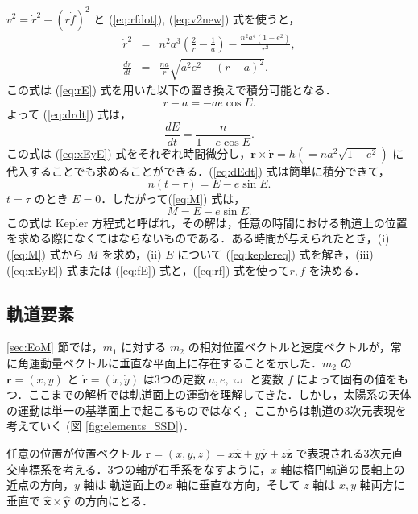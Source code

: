 \documentclass[11pt,a4paper,oneside,onecolumn]{jarticle}
\begin{document}
$v^2 = \dot{r}^2 + (r \dot{f})^2$ と (\ref{eq:rfdot}), (\ref{eq:v2new}) 式を使うと，
\begin{eqnarray}
\dot{r}^2 & = & n^2 a^3 \left( \frac{2}{r} - \frac{1}{a} \right) - \frac{n^2 a^4 (1 - e^2)}{r^2}, \\
\frac{dr}{dt} & = & \frac{na}{r} \sqrt{a^2 e^2 - (r - a)^2}. \label{eq:drdt}
\end{eqnarray}
この式は (\ref{eq:rE}) 式を用いた以下の置き換えで積分可能となる．
\begin{equation}
r - a = - a e \cos E.
\end{equation}
よって (\ref{eq:drdt}) 式は，
\begin{equation}
\frac{dE}{dt} = \frac{n}{1 - e \cos E}. \label{eq:dEdt}
\end{equation}
この式は (\ref{eq:xEyE}) 式をそれぞれ時間微分し，${\bm r} \times \dot{{\bm r}} = h ( = n a^2 \sqrt{1 - e^2} )$ に代入することでも求めることができる．(\ref{eq:dEdt}) 式は簡単に積分できて，
\begin{equation}
n (t - \tau) = E - e \sin E. \label{eq:tauE}
\end{equation}
$t = \tau$ のとき $E = 0$．したがって(\ref{eq:M}) 式は，
\begin{equation}
M = E - e \sin E. \label{eq:keplereq}
\end{equation}
この式は Kepler 方程式と呼ばれ，その解は，任意の時間における軌道上の位置を求める際になくてはならないものである．ある時間が与えられたとき，(i) (\ref{eq:M}) 式から $M$ を求め，(ii) $E$ について (\ref{eq:keplereq}) 式を解き，(iii) (\ref{eq:xEyE}) 式または (\ref{eq:fE}) 式と，(\ref{eq:rf}) 式を使って$r, f$ を決める．

\subsection{軌道要素 \label{sec:elements}}
 \ref{sec:EoM} 節では，$m_1$ に対する $m_2$ の相対位置ベクトルと速度ベクトルが，常に角運動量ベクトルに垂直な平面上に存在することを示した．$m_2$ の ${\bm r} = (x, y)$ と $\dot{\bm r} = (\dot{x}, \dot{y})$ は3つの定数 $a, e, \varpi$ と変数 $f$ によって固有の値をもつ．ここまでの解析では軌道面上の運動を理解してきた．しかし，太陽系の天体の運動は単一の基準面上で起こるものではなく，ここからは軌道の3次元表現を考えていく (図 \ref{fig:elements_SSD})．
 
任意の位置が位置ベクトル ${\bm r} = (x, y, z) = x \hat{\bm x} + y \hat{\bm y} + z \hat{\bm z}$ で表現される3次元直交座標系を考える．3つの軸が右手系をなすように，$x$ 軸は楕円軌道の長軸上の近点の方向，$y$ 軸は 軌道面上の$x$ 軸に垂直な方向，そして $z$ 軸は $x, y$ 軸両方に垂直で $\hat{\bm x} \times \hat{\bm y}$ の方向にとる．
\end{document}
